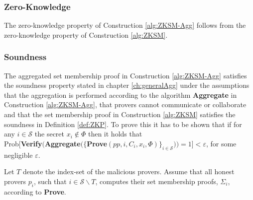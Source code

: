 
\subsubsection*{Zero-Knowledge}
The zero-knowledge property of Construction \ref{alg:ZKSM-Agg} follows from the zero-knowledge property of Construction \ref{alg:ZKSM}.%

\subsubsection*{Soundness}
The aggregated set membership proof in Construction \ref{alg:ZKSM-Agg} satisfies the soundness property stated in chapter \ref{ch:generalAgg} under the assumptions that the aggregation is performed according to the algorithm \textbf{Aggregate} in Construction \ref{alg:ZKSM-Agg},  that provers cannot communicate or collaborate and that the set membership proof in Construction \ref{alg:ZKSM} satisfies the soundness in Definition \ref{def:ZKP}. To prove this it has to be shown that if for any $i\in\mathcal{S}$ the secret $x_i\notin\Phi$ then it holds that \\ Prob$[ $\textbf{Verify}$($\textbf{Aggregate}$(\{$\textbf{Prove}$(pp,i,C_i,x_i,\Phi)\}_{i\in\mathcal{S}}) ) = 1] < \varepsilon$, for some negligible $\varepsilon$.


Let $T$ denote the index-set of the malicious provers. Assume that all honest provers $p_i$, such that $i\in\mathcal{S}\backslash T$, computes their set membership proofs, $\Sigma_i$, according to \textbf{Prove}.


